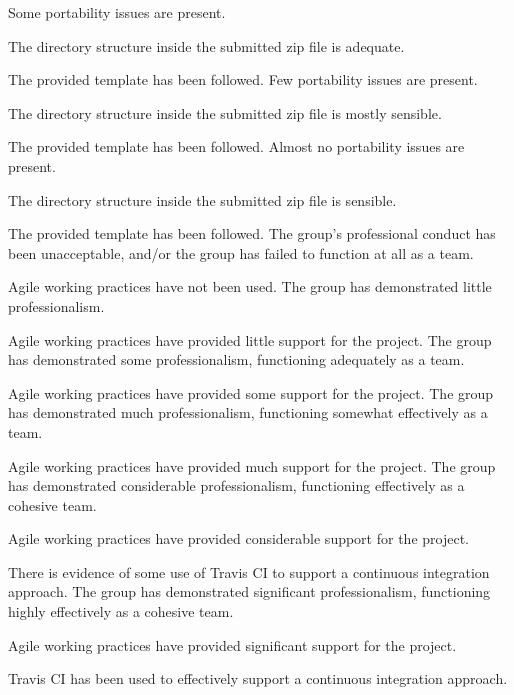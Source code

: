 \documentclass{../fal_assignment}
\begin{document}
\begin{markingrubric}
        \grade Some portability issues are present.
            \par The directory structure inside the submitted zip file is adequate.
            \par The provided template has been followed.
        \grade Few portability issues are present.
            \par The directory structure inside the submitted zip file is mostly sensible.
            \par The provided template has been followed.
        \grade Almost no portability issues are present.
            \par The directory structure inside the submitted zip file is sensible.
            \par The provided template has been followed.
%
        \grade\fail The group's professional conduct has been unacceptable,
            and/or the group has failed to function at all as a team.
            \par Agile working practices have not been used.
        \grade The group has demonstrated little professionalism.
            \par Agile working practices have provided little support for the project.
        \grade The group has demonstrated some professionalism,
            functioning adequately as a team.
            \par Agile working practices have provided some support for the project.
        \grade The group has demonstrated much professionalism,
            functioning somewhat effectively as a team.
            \par Agile working practices have provided much support for the project.
        \grade The group has demonstrated considerable professionalism,
            functioning effectively as a cohesive team.
            \par Agile working practices have provided considerable support for the project.
            \par There is evidence of some use of Travis CI to support a continuous integration approach.
        \grade The group has demonstrated significant professionalism,
            functioning highly effectively as a cohesive team.
            \par Agile working practices have provided significant support for the project.
            \par Travis CI has been used to effectively support a continuous integration approach.

\end{markingrubric}
\end{document}
